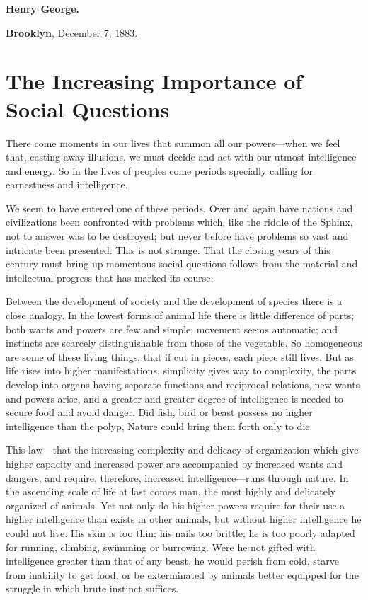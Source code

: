 \documentclass{book}
\begin{document}
\textbf{Henry George.}

\textbf{Brooklyn}, December 7, 1883.

\chapter{The Increasing Importance of Social Questions}
\label{chapter-1}
There come moments in our lives that summon all our powers—when we feel that, casting away illusions, we must decide and act with our utmost intelligence and energy. So in the lives of peoples come periods specially calling for earnestness and intelligence.

We seem to have entered one of these periods. Over and again have nations and civilizations been confronted with problems which, like the riddle of the Sphinx, not to answer was to be destroyed; but never before have problems so vast and intricate been presented. This is not strange. That the closing years of this century must bring up momentous social questions follows from the material and intellectual progress that has marked its course.

Between the development of society and the development of species there is a close analogy. In the lowest forms of animal life there is little difference of parts; both wants and powers are few and simple; movement seems automatic; and instincts are scarcely distinguishable from those of the vegetable. So homogeneous are some of these living things, that if cut in pieces, each piece still lives. But as life rises into higher manifestations, simplicity gives way to complexity, the parts develop into organs having separate functions and reciprocal relations, new wants and powers arise, and a greater and greater degree of intelligence is needed to secure food and avoid danger. Did fish, bird or beast possess no higher intelligence than the polyp, Nature could bring them forth only to die.

This law—that the increasing complexity and delicacy of organization which give higher capacity and increased power are accompanied by increased wants and dangers, and require, therefore, increased intelligence—runs through nature. In the ascending scale of life at last comes man, the most highly and delicately organized of animals. Yet not only do his higher powers require for their use a higher intelligence than exists in other animals, but without higher intelligence he could not live. His skin is too thin; his nails too brittle; he is too poorly adapted for running, climbing, swimming or burrowing. Were he not gifted with intelligence greater than that of any beast, he would perish from cold, starve from inability to get food, or be exterminated by animals better equipped for the struggle in which brute instinct suffices.
\end{document}
